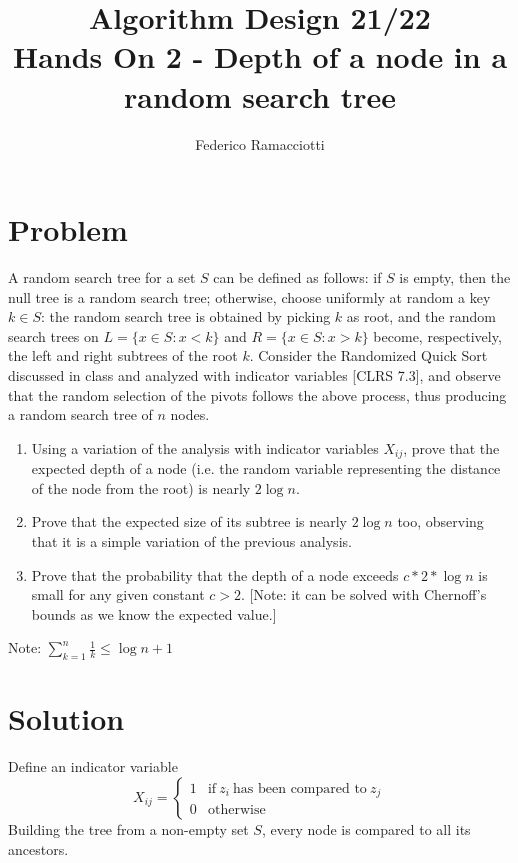 \documentclass{article}
\title{\LARGE{\textbf{Algorithm Design 21/22}}\\ \vspace{1cm} Hands On 2 - Depth of a node in a random search tree}
\author{Federico Ramacciotti}
\date{}
\begin{document}
\maketitle

\section{Problem}
A random search tree for a set $S$ can be defined as follows: if $S$ is empty, then the null tree is a random search tree; otherwise, choose uniformly at random a key $k\in S$: the random search tree is obtained by picking $k$ as root, and the random search trees on $L = \{x \in S : x < k\}$ and $R = \{x \in S : x > k\}$ become, respectively, the left and right subtrees of the root $k$.
Consider the Randomized Quick Sort discussed in class and analyzed with indicator variables [CLRS 7.3], and observe that the random selection of the pivots follows the above process, thus producing a random search tree of $n$ nodes.
\begin{enumerate}
    \item Using a variation of the analysis with indicator variables $X_{ij}$, prove that the expected depth of a node (i.e. the random variable representing the distance of the node from the root) is nearly $2\log n$.
    \item Prove that the expected size of its subtree is nearly $2\log n$ too, observing that it is a simple variation of the previous analysis.
    \item Prove that the probability that the depth of a node exceeds $c*2*\log n$ is small for any given constant $c > 2$. [Note: it can be solved with Chernoff’s bounds as we know the expected value.]
\end{enumerate}
Note: $\sum_{k=1}^{n} \frac{1}{k} \leq \log n + 1$

\section{Solution}
Define an indicator variable 
$$X_{ij}=\begin{cases}
1 & \textrm{if}\ z_i\ \textrm{has been compared to}\ z_j\\
0 & \textrm{otherwise}
\end{cases}$$
Building the tree from a non-empty set $S$, every node is compared to all its ancestors. 
\end{document}
